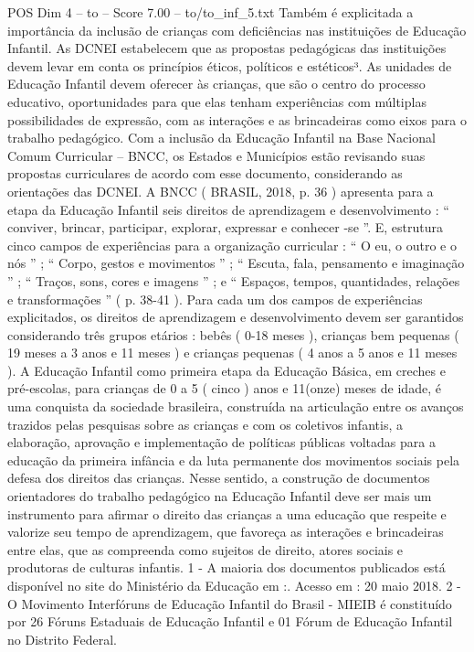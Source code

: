 \begin{textsample}{POS Dim 4 – to – Score 7.00 – to/to\_inf\_5.txt}
Também é explicitada a importância da inclusão de crianças com deficiências nas instituições de Educação Infantil.
As DCNEI estabelecem que as propostas pedagógicas das instituições devem levar em conta os princípios éticos, políticos e estéticos³.
As unidades de Educação Infantil devem oferecer às crianças, que são o centro do processo educativo, oportunidades para que elas tenham experiências com múltiplas possibilidades de expressão, com as interações e as brincadeiras como eixos para o trabalho pedagógico.
Com a inclusão da Educação Infantil na Base Nacional Comum Curricular – BNCC, os Estados e Municípios estão revisando suas propostas curriculares de acordo com esse documento, considerando as orientações das DCNEI.
A BNCC ( BRASIL, 2018, p. 36 ) apresenta para a etapa da Educação Infantil seis direitos de aprendizagem e desenvolvimento : “ conviver, brincar, participar, explorar, expressar e conhecer -se ”.
E, estrutura cinco campos de experiências para a organização curricular : “ O eu, o outro e o nós ” ; “ Corpo, gestos e movimentos ” ; “ Escuta, fala, pensamento e imaginação ” ; “ Traços, sons, cores e imagens ” ; e “ Espaços, tempos, quantidades, relações e transformações ” ( p. 38-41 ).
Para cada um dos campos de experiências explicitados, os direitos de aprendizagem e desenvolvimento devem ser garantidos considerando três grupos etários : bebês ( 0-18 meses ), crianças bem pequenas ( 19 meses a 3 anos e 11 meses ) e crianças pequenas ( 4 anos a 5 anos e 11 meses ).
A Educação Infantil como primeira etapa da Educação Básica, em creches e pré-escolas, para crianças de 0 a 5 ( cinco ) anos e 11(onze) meses de idade, é uma conquista da sociedade brasileira, construída na articulação entre os avanços trazidos pelas pesquisas sobre as crianças e com os coletivos infantis, a elaboração, aprovação e implementação de políticas públicas voltadas para a educação da primeira infância e da luta permanente dos movimentos sociais pela defesa dos direitos das crianças.
Nesse sentido, a construção de documentos orientadores do trabalho pedagógico na Educação Infantil deve ser mais um instrumento para afirmar o direito das crianças a uma educação que respeite e valorize seu tempo de aprendizagem, que favoreça as interações e brincadeiras entre elas, que as compreenda como sujeitos de direito, atores sociais e produtoras de culturas infantis. 1 - A maioria dos documentos publicados está disponível no site do Ministério da Educação em :.
Acesso em : 20 maio 2018. 2 - O Movimento Interfóruns de Educação Infantil do Brasil - MIEIB é constituído por 26 Fóruns Estaduais de Educação Infantil e 01 Fórum de Educação Infantil no Distrito Federal.

\end{textsample}
